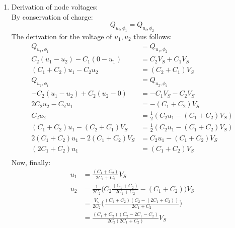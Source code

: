 {\begin{enumerate}
{\begin{enumerate}
{                }
                \item[4.] {
                    Derivation of node voltages: \\
                    By conservation of charge:
                    \[Q_{u_i, \phi_1} = Q_{u_i, \phi_2}\]
                    The derivation for the voltage of $u_1, u_2$ thus follows:
                    \begin{align*}
                        Q_{u_1, \phi_1} &= Q_{u_1, \phi_2} \\
                        C_2 (u_1 - u_2) - C_1 (0 - u_1) &= C_2 V_S + C_1 V_S \\
                        (C_1 + C_2) u_1 - C_2 u_2 &= (C_2 + C_1) V_S \\
                        Q_{u_2, \phi_1} &= Q_{u_2, \phi_2} \\
                        - C_2 (u_1 - u_2) + C_2 (u_2 - 0) &= - C_1 V_S - C_2 V_S \\
                        2C_2 u_2 - C_2 u_1 &= -(C_1 + C_2) V_S \\
                        C_2 u_2 &= \frac{1}{2} (C_2 u_1 - (C_1 + C_2) V_S) \\
                        (C_1 + C_2) u_1 - (C_2 + C_1) V_S &= \frac{1}{2} (C_2 u_1 - (C_1 + C_2) V_S) \\
                        2(C_1 + C_2) u_1 - 2(C_1 + C_2) V_S &= C_2 u_1 - (C_1 + C_2) V_S \\
                        (2C_1 + C_2) u_1 &= (C_1 + C_2) V_S \\
                    \end{align*}
                    Now, finally:
                    \begin{align*}
                        u_1 &= \frac{(C_1 + C_2)}{2C_1 + C_2} V_S \\
                        u_2 &= \frac{1}{2C_2} \bigg( C_2\frac{(C_1 + C_2)}{2C_1 + C_2} - (C_1 + C_2) \bigg) V_S \\
                        &= \frac{V_S}{2C_2} \bigg( \frac{(C_1 + C_2)(C_2 - (2C_1 + C_2))}{2C_1 + C_2} \bigg) \\
                        &= \frac{(C_1 + C_2)(C_2 - 2C_1 - C_2)}{2C_2(2C_1 + C_2)} V_S
                    \end{align*}
                    
}
\end{enumerate}}
\end{enumerate}}
